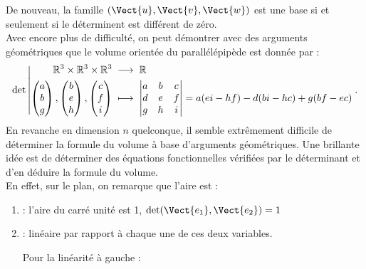 \documentclass{book}
\begin{document}
\begin{Exemple}
\begin{center}
\end{center} 
De nouveau, la famille $(\Vect{u},\Vect{v},\Vect{w})$ est une base si et seulement si le déterminent est différent de zéro.\\
Avec  encore plus de difficulté, on peut démontrer avec des arguments géométriques que le volume  orientée du parallélépipède est donnée par :  
$$
{\mathop{\mathrm{det}}\nolimits}\left|\begin{aligned}{\mathbb{R}^3\times\mathbb{R}^3\times\mathbb{R}^3}&\;\longrightarrow\;{\mathbb{R}}\\{\begin{pmatrix}
a\\b\\g
\end{pmatrix},\begin{pmatrix}
b\\e\\h
\end{pmatrix},\begin{pmatrix}
c\\f\\i
\end{pmatrix}}&\;\longmapsto\;{\begin{vmatrix}
a & b &c \\
d & e &f \\
g & h &i\\
\end{vmatrix}=a(ei-hf)-d(bi-hc)+g(bf-ec) }\end{aligned}\right..
$$
En revanche en  dimension $n$ quelconque, il semble extrêmement difficile de déterminer la formule du volume à base d'arguments géométriques. Une brillante idée est  de déterminer des équations fonctionnelles vérifiées par le déterminant et d'en déduire la formule du volume. \\
En effet,  sur le plan, on remarque que l'aire est :
\begin{enumerate}
\item {} : l'aire du carré unité est 1, $\det(\Vect{e_1},\Vect{e_2})=1$
\item {} : linéaire par rapport à chaque une de ces deux variables.
\begin{center}
Pour la linéarité à gauche :\\
\end{center}
\end{enumerate}
\end{Exemple}
\end{document}
